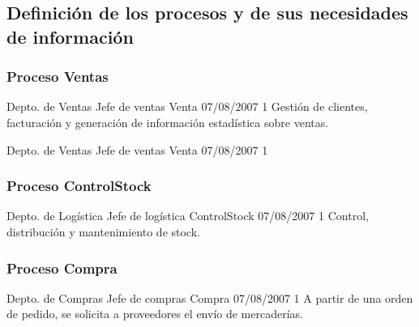\subsection{Definición de los procesos y de sus necesidades de información}

\subsubsection{Proceso \textsf{Ventas}}

\begin{apx1}
{Depto. de Ventas}
{Jefe de ventas}
{Venta}
{07/08/2007}
{1}
{Gestión de clientes, facturación y generación de información estadística sobre ventas.}
\end{apx1}

\begin{apx2}
{Depto. de Ventas}
{Jefe de ventas}
{Venta}
{07/08/2007}
{1}
  \apxDosItem{}{}{}{}
\end{apx2}


\subsubsection{Proceso \textsf{ControlStock}}
\begin{apx1}
{Depto. de Logística}
{Jefe de logística}
{ControlStock}
{07/08/2007}
{1}
{Control, distribución y mantenimiento de stock.}
\end{apx1}


\subsubsection{Proceso \textsf{Compra}}
\begin{apx1}
{Depto. de Compras}
{Jefe de compras}
{Compra}
{07/08/2007}
{1}
{A partir de una orden de pedido, se solicita a proveedores el envío de mercaderías.}
\end{apx1}

